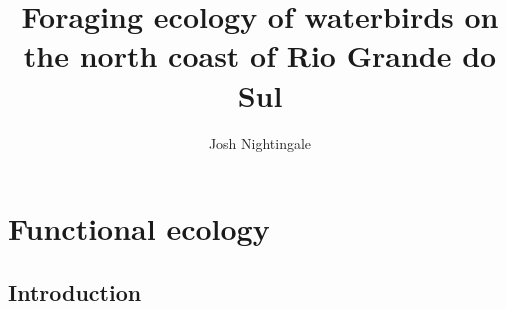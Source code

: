 \documentclass[12pt,a4paper,draft]{book}
\author{Josh Nightingale}
\title{Foraging ecology of waterbirds on the north coast of Rio Grande do Sul}
\begin{document}
\maketitle

\tableofcontents

\chapter{Functional ecology}

\section{Introduction}
%
%
%
%
%
%
%
%
%
%
\end{document}
